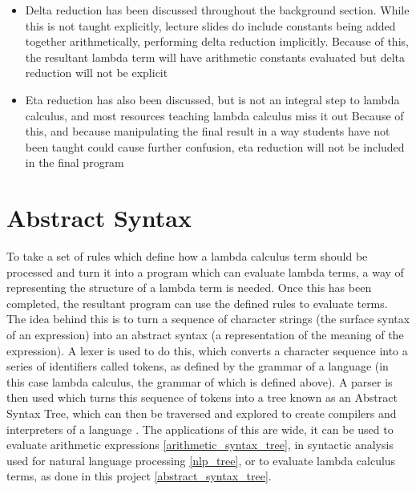 \documentclass[a4paper,12pt]{report}
\begin{document}
\begin{itemize}
	\item Delta reduction has been discussed throughout the background section. While this is not taught explicitly, lecture slides do include constants being added together arithmetically, performing delta reduction implicitly.
	\subitem Because of this, the resultant lambda term will have arithmetic constants evaluated but delta reduction will not be explicit
	\item Eta reduction has also been discussed, but is not an integral step to lambda calculus, and most resources teaching lambda calculus miss it out \cite{Acar2008} \cite{Barendregt2000} \cite{Gay2019} \cite{Horowitz2013} \cite{Rojas1998} \cite{Hankin2004}
	\subitem Because of this, and because manipulating the final result in a way students have not been taught could cause further confusion, eta reduction will not be included in the final program
\end{itemize}

\section{Abstract Syntax}

To take a set of rules which define how a lambda calculus term should be processed and turn it into a program which can evaluate lambda terms, a way of representing the structure of a lambda term is needed. Once this has been completed, the resultant program can use the defined rules to evaluate terms.\\

The idea behind this is to turn a sequence of character strings (the surface syntax of an expression) into an abstract syntax (a representation of the meaning of the expression). A lexer is used to do this, which converts a character sequence into a series of identifiers called tokens, as defined by the grammar of a language (in this case lambda calculus, the grammar of which is defined above). A parser is then used which turns this sequence of tokens into a tree known as an Abstract Syntax Tree, which can then be traversed and explored to create compilers and interpreters of a language \cite{Pierce2002}. The applications of this are wide, it can be used to evaluate arithmetic expressions \ref{arithmetic_syntax_tree}, in syntactic analysis used for natural language processing \cite{Bird2009} \ref{nlp_tree}, or to evaluate lambda calculus terms, as done in this project \ref{abstract_syntax_tree}.
\end{document}
